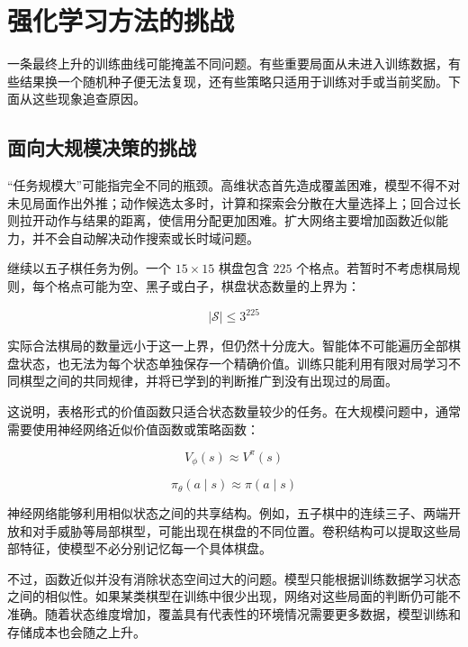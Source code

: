 \section{强化学习方法的挑战}

一条最终上升的训练曲线可能掩盖不同问题。有些重要局面从未进入训练数据，有些结果换一个随机种子便无法复现，还有些策略只适用于训练对手或当前奖励。下面从这些现象追查原因。

\subsection{面向大规模决策的挑战}

“任务规模大”可能指完全不同的瓶颈。高维状态首先造成覆盖困难，模型不得不对未见局面作出外推；动作候选太多时，计算和探索会分散在大量选择上；回合过长则拉开动作与结果的距离，使信用分配更加困难。扩大网络主要增加函数近似能力，并不会自动解决动作搜索或长时域问题。

继续以五子棋任务为例。一个 $15\times15$ 棋盘包含 $225$ 个格点。若暂时不考虑棋局规则，每个格点可能为空、黑子或白子，棋盘状态数量的上界为：

\begin{equation}
|\mathcal{S}|
\leq
3^{225}
\end{equation}

实际合法棋局的数量远小于这一上界，但仍然十分庞大。智能体不可能遍历全部棋盘状态，也无法为每个状态单独保存一个精确价值。训练只能利用有限对局学习不同棋型之间的共同规律，并将已学到的判断推广到没有出现过的局面。

这说明，表格形式的价值函数只适合状态数量较少的任务。在大规模问题中，通常需要使用神经网络近似价值函数或策略函数：

\begin{equation}
V_{\phi}(s)
\approx
V^{\pi}(s)
\end{equation}

\begin{equation}
\pi_{\theta}(a\mid s)
\approx
\pi(a\mid s)
\end{equation}

神经网络能够利用相似状态之间的共享结构。例如，五子棋中的连续三子、两端开放和对手威胁等局部棋型，可能出现在棋盘的不同位置。卷积结构可以提取这些局部特征，使模型不必分别记忆每一个具体棋盘。

不过，函数近似并没有消除状态空间过大的问题。模型只能根据训练数据学习状态之间的相似性。如果某类棋型在训练中很少出现，网络对这些局面的判断仍可能不准确。随着状态维度增加，覆盖具有代表性的环境情况需要更多数据，模型训练和存储成本也会随之上升。


